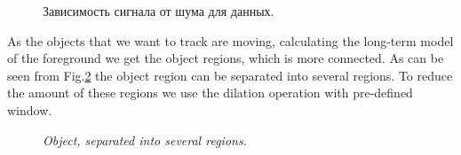 \documentclass[12pt,a4paper,oneside,titlepage]{article}
\begin{document}
\begin{figure}[h]
\begin{minipage}[h]{0.19\linewidth}
	\end{minipage}

	\caption{Зависимость сигнала от шума для данных.}
	\label{ris:image1}
\end{figure}



As the objects that we want to track are moving, calculating the long-term model of  the foreground we get the object regions, which is more connected.
As can be seen from Fig.\ref{fig:fig3} the object region can be separated into several regions.
To reduce the amount of these regions we use the dilation operation with pre-defined window.


\begin{figure}[h]
  \caption{\textit{Object, separated into several regions.}}
  \label{fig:fig3}
\end{figure}
\end{document}
